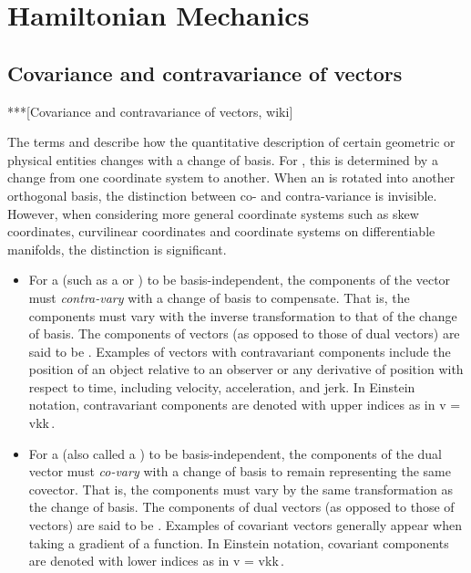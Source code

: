 \section{Hamiltonian Mechanics}

\subsection{Covariance and contravariance of vectors}

***[Covariance and contravariance of vectors, wiki]

The terms  and  describe how the quantitative description of certain geometric or physical entities changes with a change of basis. For , this is determined by a change from one coordinate system to another. When an  is rotated into another orthogonal basis, the distinction between co- and contra-variance is invisible. However, when considering more general coordinate systems such as skew coordinates, curvilinear coordinates and coordinate systems on differentiable manifolds, the distinction is significant.

\begin{itemize}
\item For a  (such as a  or ) to be basis-independent, the components of the vector must \emph{contra-vary} with a change of basis to compensate. That is, the components must vary with the inverse transformation to that of the change of basis. The components of vectors (as opposed to those of dual vectors) are said to be . Examples of vectors with contravariant components include the position of an object relative to an observer or any derivative of position with respect to time, including velocity, acceleration, and jerk. In Einstein notation, contravariant components are denoted with upper indices as in
\beq
v = \cnvec vk\nbvec k\,.
\eeq

\item For a  (also called a ) to be basis-independent, the components of the dual vector must \emph{co-vary} with a change of basis to remain representing the same covector. That is, the components must vary by the same transformation as the change of basis. The components of dual vectors (as opposed to those of vectors) are said to be . Examples of covariant vectors generally appear when taking a gradient of a function. In Einstein notation, covariant components are denoted with lower indices as in
\beq
v = \covec vk\dbvec k\,.
\eeq
\end{itemize}

